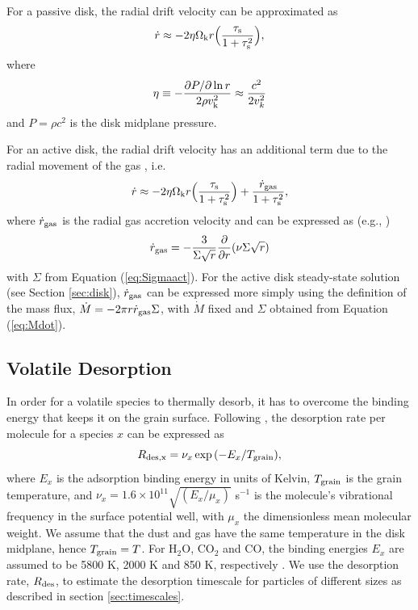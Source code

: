 \documentclass[apj]{emulateapj}
\begin{document}
For a passive disk, the radial drift velocity can be approximated as
\begin{equation}
\label{eq:rdotpas}
\dot{r} \approx -2 \eta \Omega_{\rm k} r \Big(\frac{\tau_{\rm s}}{1+\tau_{\rm s}^2}\Big),
\end{equation}
where
\begin{equation}
\label{eq:eta}
\eta \equiv - \frac{\partial P/\partial \ln r}{2 \rho v_{\rm k}^2} \approx \frac{c^2}{2 v_k^2}
\end{equation}
and $P = \rho c^2$ is the disk midplane pressure. 

For an active disk, the radial drift velocity has an additional term due to the radial movement of the gas \citep{birnstiel12}, i.e.
\begin{equation}
\label{eq:rdotact}
\dot{r} \approx -2 \eta \Omega_{\rm k} r \Big(\frac{\tau_{\rm s}}{1+\tau_{\rm s}^2}\Big) + \frac{\dot{r}_{\rm gas}}{1+\tau_{\rm s}^2},
\end{equation}
where $\dot{r}_{\rm gas}$ is the radial gas accretion velocity and can be expressed as (e.g., \citealt{fkr02})
\begin{equation}
\label{eq:vgas}
\dot{r}_{\rm gas} = - \frac{3}{\Sigma \sqrt{r}} \frac{\partial}{\partial r}(\nu \Sigma \sqrt{r}) 
\end{equation}
with $\Sigma$ from Equation (\ref{eq:Sigmaact}). For the active disk steady-state solution (see Section \ref{sec:disk}), $\dot{r}_{\rm gas}$ can be expressed more simply using the definition of the mass flux, $\dot{M}=-2 \pi r \dot{r}_{\rm gas} \Sigma$, with $\dot{M}$ fixed and $\Sigma$ obtained from Equation (\ref{eq:Mdot}). 

\subsection{Volatile Desorption}
\label{sec:desorption}


In order for a volatile species to thermally desorb, it has to overcome the binding energy that keeps it on the grain surface. Following \citet{hollenbach09}, the desorption rate per molecule for a species $x$ can be expressed as
\begin{equation}
\label{eq:Rdes}
R_{\rm{des}, x} = \nu_x \exp{(-E_x/T_{\rm grain})},
\end{equation}
where $E_x$ is the adsorption binding energy in units of Kelvin, $T_{\rm grain}$ is the grain temperature, and $\nu_x=1.6 \times 10^{11} \sqrt{(E_x/\mu_x)}$ s$^{-1}$ is the molecule's vibrational frequency in the surface potential well, with $\mu_x$ the dimensionless mean molecular weight. We assume that the dust and gas have the same temperature in the disk midplane, hence $T_{\rm grain}=T$. For H$_2$O, CO$_2$ and CO, the binding energies $E_x$ are assumed to be 5800 K, 2000 K and 850 K, respectively \citep{oberg11}. We use the desorption rate, $R_{\rm des}$, to estimate the desorption timescale for particles of different sizes as described in section \ref{sec:timescales}. 
\end{document}
